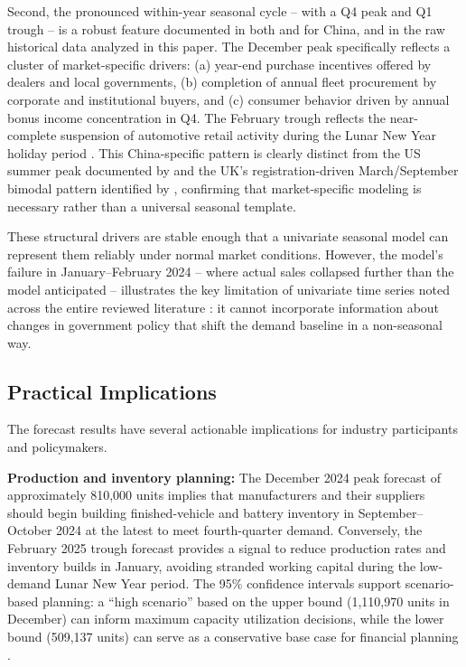 \documentclass[12pt]{article}
\begin{document}
Second, the pronounced within-year seasonal cycle -- with a Q4 peak and Q1 trough -- is a robust feature documented in both \citet{chen2025} and \citet{liang2025} for China, and in the raw historical data analyzed in this paper. The December peak specifically reflects a cluster of market-specific drivers: (a) year-end purchase incentives offered by dealers and local governments, (b) completion of annual fleet procurement by corporate and institutional buyers, and (c) consumer behavior driven by annual bonus income concentration in Q4. The February trough reflects the near-complete suspension of automotive retail activity during the Lunar New Year holiday period \citep{chen2025}. This China-specific pattern is clearly distinct from the US summer peak documented by \citet{cetin2024} and the UK's registration-driven March/September bimodal pattern identified by \citet{lu2024}, confirming that market-specific modeling is necessary rather than a universal seasonal template.

These structural drivers are stable enough that a univariate seasonal model can represent them reliably under normal market conditions. However, the model's failure in January--February 2024 -- where actual sales collapsed further than the model anticipated -- illustrates the key limitation of univariate time series noted across the entire reviewed literature \citep{chen2025, ge2024, yang2024}: it cannot incorporate information about changes in government policy that shift the demand baseline in a non-seasonal way.

\subsection{Practical Implications}

The forecast results have several actionable implications for industry participants and policymakers.

\textbf{Production and inventory planning:} The December 2024 peak forecast of approximately 810,000 units implies that manufacturers and their suppliers should begin building finished-vehicle and battery inventory in September--October 2024 at the latest to meet fourth-quarter demand. Conversely, the February 2025 trough forecast provides a signal to reduce production rates and inventory builds in January, avoiding stranded working capital during the low-demand Lunar New Year period. The 95\% confidence intervals support scenario-based planning: a ``high scenario'' based on the upper bound (1,110,970 units in December) can inform maximum capacity utilization decisions, while the lower bound (509,137 units) can serve as a conservative base case for financial planning \citep{cetin2024}.
\end{document}
